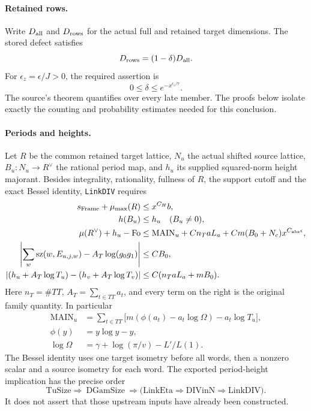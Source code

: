 \paragraph{Retained rows.}
Write $D_{\rm all}$ and $D_{\rm rows}$ for the actual full and retained
target dimensions. The stored defect satisfies
\[
 D_{\rm rows}=(1-\delta)D_{\rm all}.
\]
For $\epsilon_z=\epsilon/J>0$, the required assertion is
\begin{equation}\label{eq:gqt-defect}
                  0\le\delta\le e^{-x^{\epsilon_z/7}}.
\end{equation}
The source's theorem quantifies over every late member. The proofs
below isolate exactly the counting and probability estimates needed
for this conclusion.

\paragraph{Periods and heights.}
Let $R$ be the common retained target lattice, $N_u$ the actual shifted
source lattice, $B_u:N_u\to R^\vee$ the rational period map, and
$h_u$ its supplied squared-norm height majorant. Besides integrality,
rationality, fullness of $R$, the support cutoff and the exact Bessel
identity, \texttt{LinkDIV} requires
\begin{align}
 s_{\rm Frame}+\mu_{\max}(R)&\le x^{C_H}b,
                                                        \label{eq:gqt-height1}\\
 h(B_u)&\le h_u\quad(B_u\ne0),                           \label{eq:gqt-height2}\\
 \mu(R^\vee)+h_u-\mathrm{Fo}
   &\le\mathrm{MAIN}_u+C n_TaL_a
       +Cm(B_0+N_c)x^{C_{\rm abs}\epsilon},               \label{eq:gqt-height3}\\
 \left|\sum_w\mathrm{sz}(w,E_{u,j,w})
                  -A_T\log(g_0g_1)\right|&\le CB_0,     \label{eq:gqt-height4}\\
 \left|(h_u+A_T\log T_u)-(h_v+A_T\log T_v)\right|
       &\le C(n_TaL_a+mB_0).                             \label{eq:gqt-height5}
\end{align}
Here $n_T=\#TT$, $A_T=\sum_{t\in TT}a_t$, and every term on
the right is the original family quantity. In particular
\[
 \begin{aligned}
 \mathrm{MAIN}_u&=
 \sum_{t\in TT}\bigl[m(\phi(a_t)-a_t\log\Omega)-a_t\log T_u\bigr],\\
 \phi(y)&=y\log y-y,\\
 \log\Omega&=\gamma+\log(\pi/v)-L'/L(1).
 \end{aligned}
\]
The Bessel identity uses one target isometry before all words, then a
nonzero scalar and a source isometry for each word. The exported
period-height implication has the precise order
\[
 \mathrm{TuSize}\Longrightarrow\ \mathrm{DGamSize}\
 \Longrightarrow\bigl(\mathrm{LinkEta}\Longrightarrow
                     \mathrm{DIVinN}\Longrightarrow\mathrm{LinkDIV}\bigr).
\]
It does not assert that those upstream inputs have already been
constructed.

